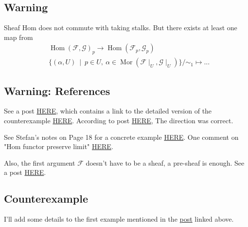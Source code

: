 \subsection{Warning}

Sheaf Hom does not commute with taking stalks. But there exists at least one map from 
\begin{align*}
	&\operatorname{Hom}(\mathscr F,\mathscr G)_p\to \operatorname{Hom}(\mathscr F_p,\mathscr G_p)\\
	& \{(\alpha,U)~\mid~ p\in U,~ \alpha\in \operatorname{Mor}(\mathscr F\mid_U,\mathscr G\mid_U)\}/\sim_1 \mapsto ... 
\end{align*}

\subsection{Warning: References}

See a post \href{https://math.stackexchange.com/questions/16203/why-doesnt-hom-commute-with-taking-stalks}{HERE}, which contains a link to the detailed version of the counterexample \href{http://www.jliumath.com/teaching/fall2022AG/Sheet5.pdf}{HERE}. According to post \href{https://mathoverflow.net/questions/642/stalks-of-sheaf-hom}{HERE}, The direction was correct.

See Stefan's notes on Page 18 for a concrete example \href{https://www.math.toronto.edu/jkamnitz/seminar/perverse/stefan.pdf}{HERE}. One comment on "Hom functor preserve limit" \href{https://ncatlab.org/nlab/show/hom-functor+preserves+limits}{HERE}.

Also, the first argument $\mathscr F$ doesn't have to be a sheaf, a pre-sheaf is enough. See a post \href{https://math.stackexchange.com/questions/155188/about-sheaf-hom}{HERE}.

\subsection{Counterexample}

I'll add some details to the first example mentioned in the \href{https://math.stackexchange.com/questions/16203/why-doesnt-hom-commute-with-taking-stalks}{post} linked above.

